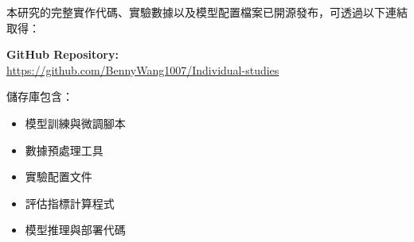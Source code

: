


本研究的完整實作代碼、實驗數據以及模型配置檔案已開源發布，可透過以下連結取得：

\bigskip
\noindent \textbf{GitHub Repository:} \\
\url{https://github.com/BennyWang1007/Individual-studies}

\bigskip
\noindent 儲存庫包含：
\begin{itemize}
\item 模型訓練與微調腳本
\item 數據預處理工具
\item 實驗配置文件
\item 評估指標計算程式
\item 模型推理與部署代碼
\end{itemize}
